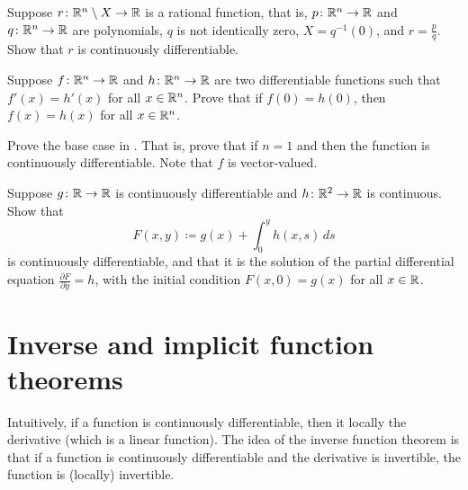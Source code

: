 \begin{exercise}
Suppose $r \colon {\mathbb{R}}^n \setminus X \to {\mathbb{R}}$ is a rational function, that is,
$p \colon {\mathbb{R}}^n \to {\mathbb{R}}$ and
$q \colon {\mathbb{R}}^n \to {\mathbb{R}}$ are polynomials,
$q$ is not identically zero,
$X = q^{-1}(0)$, and
$r = \frac{p}{q}$.
Show that $r$ is continuously differentiable.
\end{exercise}

\begin{exercise}
Suppose $f \colon {\mathbb{R}}^n \to {\mathbb{R}}$ and $h \colon {\mathbb{R}}^n \to {\mathbb{R}}$ are two 
differentiable functions such that $f'(x) = h'(x)$ for all $x \in {\mathbb{R}}^n$.
Prove that
if $f(0) = h(0)$, then $f(x) = h(x)$ for all $x \in {\mathbb{R}}^n$.
\end{exercise}

\begin{exercise}
Prove the base case
in .  That is, prove that
if $n=1$ and 
 then the function is continuously
differentiable.  Note that $f$ is vector-valued.
\end{exercise}

\begin{exercise}
Suppose $g \colon {\mathbb{R}} \to {\mathbb{R}}$ is continuously differentiable and
$h \colon {\mathbb{R}}^2 \to {\mathbb{R}}$ is continuous.  Show that
\begin{equation*}
F(x,y) \coloneqq g(x) + \int_0^y h(x,s) \,ds
\end{equation*}
is continuously differentiable, and that it is the solution of 
the partial differential equation $\frac{\partial F}{\partial y} = h$,
with the initial condition $F(x,0) = g(x)$ for all $x \in {\mathbb{R}}$.
\end{exercise}



\sectionnewpage
\section{Inverse and implicit function theorems}
\label{sec:svinvfuncthm}


Intuitively, if a function is continuously differentiable, then it
locally  the derivative (which is a linear function).
The idea of the inverse function theorem is that if a function is
continuously differentiable and the derivative is invertible, the function is
(locally) invertible.


